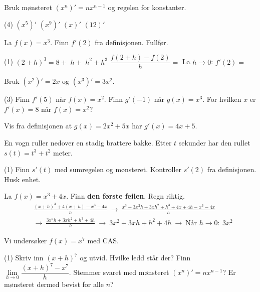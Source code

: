 
Bruk mønsteret $(x^n)' = nx^{n-1}$ og regelen for konstanter.
\begin{tasks}(4)
  \task $(x^5)'$
  \task $(x^9)'$
  \task $(x)'$
  \task $(12)'$
\end{tasks}

La $f(x) = x^3$. Finn $f'(2)$ fra definisjonen. Fullfør.
\begin{tasks}(1)
  \task $(2 + h)^3 = 8 +$ \skrivlinje[1.5cm] $h +$ \skrivlinje[1.5cm] $h^2 + h^3$
  \task $\dfrac{f(2 + h) - f(2)}{h} =$ \skrivlinje[4cm]
  \task La $h \to 0$: \quad $f'(2) =$ \skrivlinje[2cm]
\end{tasks}

Bruk $(x^2)' = 2x$ og $(x^3)' = 3x^2$.
\begin{tasks}(3)
  \task Finn $f'(5)$ når $f(x) = x^2$.
  \task Finn $g'(-1)$ når $g(x) = x^3$.
  \task For hvilken $x$ er $f'(x) = 8$ når $f(x) = x^2$?
\end{tasks}


Vis fra definisjonen at $g(x) = 2x^2 + 5x$ har $g'(x) = 4x + 5$.

En vogn ruller nedover en stadig brattere bakke. Etter $t$ sekunder har den rullet $s(t) = t^3 + t^2$ meter.
\begin{tasks}(1)
  \task Finn $s'(t)$ med sumregelen og mønsteret.
  \task Kontroller $s'(2)$ fra definisjonen. Husk enhet.
\end{tasks}

La $f(x) = x^3 + 4x$. Finn \textbf{den første feilen}. Regn riktig.
\[ \begin{aligned}
&\frac{(x + h)^3 + 4(x + h) - x^3 - 4x}{h} \ \to\ \frac{x^3 + 3x^2h + 3xh^2 + h^3 + 4x + 4h - x^3 - 4x}{h}\\
&\to\ \frac{3x^2h + 3xh^2 + h^3 + 4h}{h} \ \to\ 3x^2 + 3xh + h^2 + 4h \ \to\ \text{Når } h \to 0:\ 3x^2
\end{aligned} \]

Vi undersøker $f(x) = x^7$ med CAS.
\begin{tasks}(1)
  \task Skriv inn $(x + h)^7$ og utvid. Hvilke ledd står der?
  \task Finn $\lim\limits_{h \to 0} \dfrac{(x + h)^7 - x^7}{h}$.
  \task Stemmer svaret med mønsteret $(x^n)' = nx^{n-1}$? Er mønsteret dermed bevist for alle $n$?
\end{tasks}

